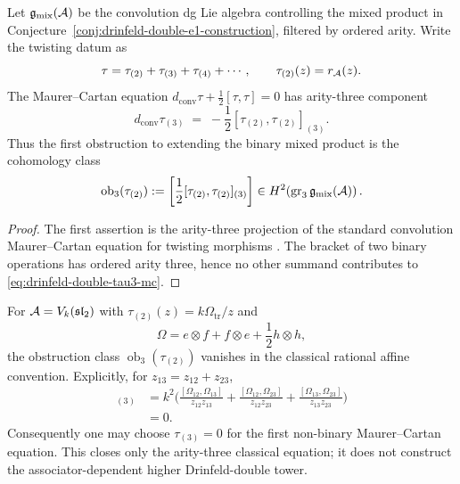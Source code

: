 \begin{proposition}
\label{prop:drinfeld-double-tau3-mc}
%
%
Let $\mathfrak g_{\mathrm{mix}}(\mathcal{A})$ be the convolution dg Lie algebra
controlling the mixed product in
Conjecture~\ref{conj:drinfeld-double-e1-construction}, filtered by
ordered arity. Write the twisting datum as
\[
 \tau=\tau_{(2)}+\tau_{(3)}+\tau_{(4)}+\cdots,
 \qquad
 \tau_{(2)}(z)=r_{\mathcal{A}}(z).
\]
The Maurer--Cartan equation
$d_{\mathrm{conv}}\tau+\frac12[\tau,\tau]=0$ has arity-three component
\begin{equation}\label{eq:drinfeld-double-tau3-mc}
 d_{\mathrm{conv}}\tau_{(3)}
 \;=\;
 -\frac12[\tau_{(2)},\tau_{(2)}]_{(3)} .
\end{equation}
Thus the first obstruction to extending the binary mixed product is the
cohomology class
\begin{equation}\label{eq:drinfeld-double-ob3}
 \operatorname{ob}_3(\tau_{(2)})
 :=
 \left[\frac12[\tau_{(2)},\tau_{(2)}]_{(3)}\right]
 \in H^2\!\left(\operatorname{gr}_3
 \mathfrak g_{\mathrm{mix}}(\mathcal{A})\right).
\end{equation}
\end{proposition}

\begin{proof}
The first assertion is the arity-three projection of the standard
convolution Maurer--Cartan equation for twisting morphisms
\cite[Ch.~6 and Ch.~10]{LV12}. The bracket of two binary operations
has ordered arity three, hence no other summand contributes to
\eqref{eq:drinfeld-double-tau3-mc}.
\end{proof}

\begin{computation}
\label{comp:drinfeld-double-sl2-tau3}
%
For $\mathcal{A}=V_k(\mathfrak{sl}_2)$ with
$\tau_{(2)}(z)=k\Omega_{\mathrm{tr}}/z$ and
\[
 \Omega=e\otimes f+f\otimes e+\frac12 h\otimes h,
\]
the obstruction class
$\operatorname{ob}_3(\tau_{(2)})$ vanishes in the classical rational
affine convention. Explicitly, for $z_{13}=z_{12}+z_{23}$,
\begin{align}
[\tau_{(2)},\tau_{(2)}]_{(3)}
&=
k^2\Bigg(
\frac{[\Omega_{12},\Omega_{13}]}{z_{12}z_{13}}
+\frac{[\Omega_{12},\Omega_{23}]}{z_{12}z_{23}}
+\frac{[\Omega_{13},\Omega_{23}]}{z_{13}z_{23}}
\Bigg) \nonumber\\
&=0.
\label{eq:drinfeld-double-sl2-cybe}
\end{align}
Consequently one may choose $\tau_{(3)}=0$ for the first non-binary
Maurer--Cartan equation. This closes only the arity-three classical
equation; it does not construct the associator-dependent higher
Drinfeld-double tower.
\end{computation}

